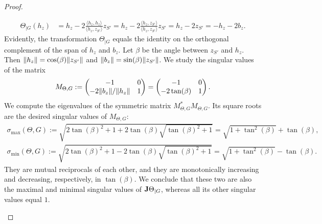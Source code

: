 \documentclass[10pt,a4paper]{article}
\begin{document}
\begin{proof}
\begin{itemize}
        \begin{align*}
            \Theta_{|G}( h_{z} ) 
            &= 
            h_{z}
            - 
            2 \frac{\langle h_{z}, h_{z} \rangle}{\langle h_{z}, z_{S'} \rangle} z_{S'}
            = 
            h_{z}
            - 
            2 \frac{\langle h_{z}, z_{S'} \rangle}{\langle h_{z}, z_{S'} \rangle} z_{S'}
            = 
            h_{z}
            - 
            2 z_{S'}
            = 
            - h_{z}
            - 
            2 b_{z}
            .
        \end{align*}
        Evidently, the transformation $\Theta_{|G}$ equals the identity on the orthogonal complement of the span of $h_{z}$ and $b_{z}$. 
        Let $\beta$ be the angle between $z_{S'}$ and $h_{z}$. 
        Then $\|  h_{z}  \| = \cos(\beta) \|  z_{S'}  \|$ and $\|  b_{z}  \| = \sin(\beta) \|  z_{S'}  \|$. 
        We study the singular values of the matrix 
        \begin{align*}
            M_{\Theta,G} 
            := 
            \begin{pmatrix}
            -1                 & 0
            \\ 
            -2 \|  b_{z}  \|/\|  h_{z}  \| & 1
            \end{pmatrix}
            =
            \begin{pmatrix}
            -1             & 0
            \\ 
            -2 \tan(\beta) & 1
            \end{pmatrix}
            .
        \end{align*}
        We compute the eigenvalues of the symmetric matrix $M_{\Theta,G}^{\ast} M_{\Theta,G}$. 
        Its square roots are the desired singular values of $M_{\Theta,G}$:
        \begin{align}
            \sigma_{\max}(\Theta,G) := \sqrt{ 2\tan(\beta)^2 + 1 + 2 \tan(\beta) \sqrt{ \tan(\beta)^2 + 1 } } = \sqrt{ 1 + \tan^{2}(\beta) } + \tan(\beta) \label{math:theta_max}
            ,
            \\
            \sigma_{\min}(\Theta,G) := \sqrt{ 2\tan(\beta)^2 + 1 - 2 \tan(\beta) \sqrt{ \tan(\beta)^2 + 1 } } = \sqrt{ 1 + \tan^{2}(\beta) } - \tan(\beta) \label{math:theta_min}
            .
        \end{align}
        They are mutual reciprocals of each other, and they are monotonically increasing and decreasing, respectively, in $\tan(\beta)$.
        We conclude that these two are also the maximal and minimal singular values of ${\mathbf{J}}\Theta_{|G}$,
        whereas all its other singular values equal $1$. 
        

\end{itemize}
\end{proof}
\end{document}

